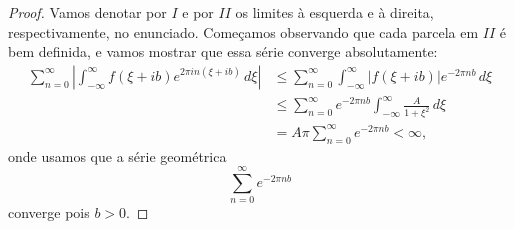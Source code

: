         \begin{proof}
            Vamos denotar por $I$ e por $\mathit{II}$ os limites à esquerda e à direita, respectivamente, 
            no enunciado. Começamos observando que cada parcela em $\mathit{II}$ é bem definida, e vamos mostrar 
            que essa série converge absolutamente:
            \begin{align*}
                \sum_{n=0}^{\infty}\left|\int_{-\infty}^{\infty} f(\xi + ib)
                e^{2 \pi i n(\xi + i b)} \, d\xi\right| 
                &\leq \sum_{n=0}^{\infty}\int_{-\infty}^{\infty} |f(\xi + ib)|
                e^{-2 \pi nb} \, d\xi \\
                &\leq \sum_{n=0}^{\infty}e^{-2 \pi nb}\int_{-\infty}^{\infty} \frac{A}{1 + \xi^2}\, d\xi \\
                &= A\pi\sum_{n=0}^{\infty}e^{-2 \pi nb}
                < \infty,
            \end{align*}
        onde usamos que a série geométrica
        \begin{equation*}
            \sum_{n=0}^{\infty}e^{-2 \pi nb}
        \end{equation*}
        converge pois $b > 0$.
        

\end{proof}
